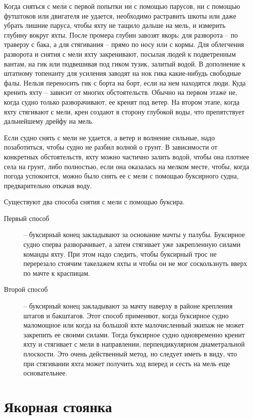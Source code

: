 \documentclass[a4paper, 12pt, twoside, final, book, russian, fittopage, cyremdash]{ncc}
\begin{document}
Когда сняться с мели с первой попытки ни с помощью парусов, ни с помощью футштоков или двигателя не удается, необходимо растравить шкоты или даже убрать лишние паруса, чтобы яхту не тащило дальше на мель, и измерить глубину вокруг яхты. После промера глубин завозят якорь: для разворота \--- по траверзу с бака, а для стягивания \--- прямо по носу или с кормы. Для облегчения разворота и снятия с мели яхту закренивают, посылая людей к подветренным вантам, на гик или подвешивая под гиком тузик, залитый водой. В дополнение к штатному топенанту для усиления заводят на нок гика какие-нибудь свободные фалы. Нельзя переносить гик с борта на борт, если на нем находятся люди. Куда кренить яхту \--- зависит от многих обстоятельств. Обычно на первом этаже не, когда судно только разворачивают, ее кренят под ветер. На втором этапе, когда яхту стягивают с мели, крен создают в сторону глубокой воды, что препятствует дальнейшему дрейфу на мель.

Если судно снять с мели не удается, а ветер и волнение сильные, надо позаботиться, чтобы судно не разбил волной о грунт. В зависимости от конкретных обстоятельств, яхту можно частично залить водой, чтобы она плотнее села на грунт, либо полностью, если она оказалась на мелком месте, чтобы, когда погода успокоится, можно было снять ее с мели с помощью буксирного судна, предварительно откачав воду.

Существуют два способа снятия с мели с помощью буксира.
\begin{description}
\item[Первый способ] \--- буксирный конец закладывают за основание мачты у палубы. Буксирное судно сперва разворачивает, а затем стягивает уже закрепленную силами команды яхту. При этом надо следить, чтобы буксирный трос не перерезало стоячим такелажем яхты и чтобы он не мог соскользнуть вверх по мачте к краспицам.
\item[Второй способ] \--- буксирный конец закладывают за мачту наверху в районе крепления штагов и бакштагов. Этот способ применяют, когда буксирное судно маломощное или когда на большой яхте малочисленный экипаж не может закрепить ее своими силами. Тогда буксирное судно одновременно кренит яхту и стягивает с мели в направлении, перпендикулярном диаметральной плоскости. Это очень действенный метод, но следует иметь в виду, что при стягивании яхта может получить ход вперед и сесть на мель еще основательнее.
\end{description}

\section{Якорная стоянка}
\end{document}
